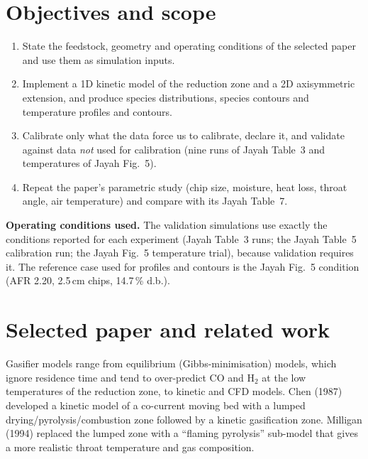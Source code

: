 \documentclass[11pt,a4paper]{article}
\begin{document}
\section{Objectives and scope}
\begin{enumerate}
\item State the feedstock, geometry and operating conditions of the selected paper and use them as simulation inputs.
\item Implement a 1D kinetic model of the reduction zone and a 2D axisymmetric extension, and produce species distributions, species contours and temperature profiles and contours.
\item Calibrate only what the data force us to calibrate, declare it, and validate against data \emph{not} used for calibration (nine runs of Jayah Table~3 and temperatures of Jayah Fig.~5).
\item Repeat the paper's parametric study (chip size, moisture, heat loss, throat angle, air temperature) and compare with its Jayah Table~7.
\end{enumerate}
\textbf{Operating conditions used.} The validation simulations use exactly the conditions reported for each experiment (Jayah Table~3 runs; the Jayah Table~5 calibration run; the Jayah Fig.~5 temperature trial), because validation requires it. The reference case used for profiles and contours is the Jayah Fig.~5 condition (AFR 2.20, 2.5\,cm chips, 14.7\,\% d.b.).

\section{Selected paper and related work}
Gasifier models range from equilibrium (Gibbs-minimisation) models, which ignore residence time and tend to over-predict CO and H$_2$ at the low temperatures of the reduction zone, to kinetic and CFD models. Chen (1987) developed a kinetic model of a co-current moving bed with a lumped drying/pyrolysis/combustion zone followed by a kinetic gasification zone. Milligan (1994) replaced the lumped zone with a ``flaming pyrolysis'' sub-model that gives a more realistic throat temperature and gas composition.
\end{document}
